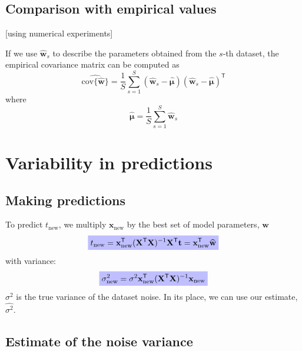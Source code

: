 \documentclass[a4paper,11pt]{article} %
\newcommand{\highlighteq}[1]{\colorbox{blue!25}{$\displaystyle#1$}}
\begin{document}
\subsection{Comparison with empirical values}

[using numerical experiments]

If we use $\widehat{\mathbf{w}}_{s}$ to describe the parameters obtained from the $s$-th
dataset, the empirical covariance matrix can be computed as
\begin{equation*}
\widehat{ \mathrm{cov} \{ \widehat{\mathbf{w}} \} } = \frac{1}{S} \sum_{s=1}^{S}
\left( \widehat{\mathbf{w}}_{s} - \widehat{\boldsymbol{\mu}} \right)
\left( \widehat{\mathbf{w}}_{s} - \widehat{\boldsymbol{\mu}} \right)^{\mathsf{T}}
\end{equation*}
where
\begin{equation*}
\widehat{\boldsymbol{\mu}} = \frac{1}{S} \sum_{s=1}^{S} \widehat{\mathbf{w}}_{s}
\end{equation*}

\section{Variability in predictions}

\subsection{Making predictions}

To predict $t_{\mathrm{new}}$, we multiply $\mathbf{x}_{\mathrm{new}}$
by the best set of model parameters, $\widehat{\mathbf{w}}$
\begin{equation}
\highlighteq{
t_{\mathrm{new}} = \mathbf{x}_{\mathrm{new}}^{\mathsf{T}}
(\mathbf{X}^{\mathsf{T}}\mathbf{X})^{-1}
\mathbf{X}^{\mathsf{T}}\mathbf{t} = 
\mathbf{x}_{\mathrm{new}}^{\mathsf{T}} \widehat{\mathbf{w}}
}
\end{equation}
with variance:
\begin{equation}
\highlighteq{
\sigma^2_{\mathrm{new}} = \sigma^{2} \mathbf{x}^{\mathsf{T}}_{\mathrm{new}}
(\mathbf{X}^{\mathsf{T}}\mathbf{X})^{-1} \mathbf{x}_{\mathrm{new}}
}
\end{equation}
$\sigma^2$ is the true variance of the dataset noise. In its place, we can use our
estimate, $\widehat{\sigma^2}$.

\subsection{Estimate of the noise variance}
\end{document}
